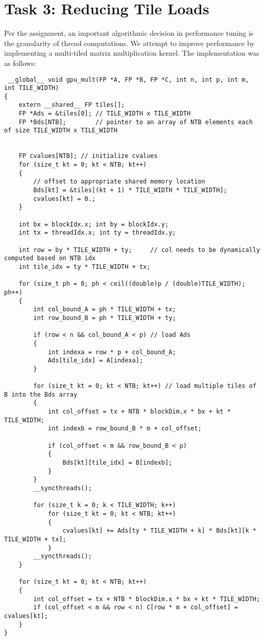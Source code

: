 \documentclass{article}
\begin{document}
\section{Task 3: Reducing Tile Loads}
Per the assignment, an important algorithmic decision in performance tuning 
is the granularity of thread computations. We attempt to improve performance 
by implementing a multi-tiled matrix multiplication kernel. The implementation was 
as follows:
\begin{lstlisting}
 __global__ void gpu_mult(FP *A, FP *B, FP *C, int n, int p, int m, int TILE_WIDTH)
{
    extern __shared__ FP tiles[];
    FP *Ads = &tiles[0]; // TILE_WIDTH x TILE_WIDTH
    FP *Bds[NTB];        // pointer to an array of NTB elements each of size TILE_WIDTH x TILE_WIDTH

    
    FP cvalues[NTB]; // initialize cvalues
    for (size_t kt = 0; kt < NTB; kt++)
    {
        // offset to appropriate shared memory location
        Bds[kt] = &tiles[(kt + 1) * TILE_WIDTH * TILE_WIDTH]; 
        cvalues[kt] = 0.;
    }

    int bx = blockIdx.x; int by = blockIdx.y;
    int tx = threadIdx.x; int ty = threadIdx.y;

    int row = by * TILE_WIDTH + ty;     // col needs to be dynamically computed based on NTB idx
    int tile_idx = ty * TILE_WIDTH + tx;

    for (size_t ph = 0; ph < ceil((double)p / (double)TILE_WIDTH); ph++)
    {
        int col_bound_A = ph * TILE_WIDTH + tx;
        int row_bound_B = ph * TILE_WIDTH + ty;

        if (row < n && col_bound_A < p) // load Ads
        {
            int indexa = row * p + col_bound_A;
            Ads[tile_idx] = A[indexa];
        }

        for (size_t kt = 0; kt < NTB; kt++) // load multiple tiles of B into the Bds array
        {
            int col_offset = tx + NTB * blockDim.x * bx + kt * TILE_WIDTH;
            int indexb = row_bound_B * m + col_offset;

            if (col_offset < m && row_bound_B < p)
            {
                Bds[kt][tile_idx] = B[indexb];
            }
        }
        __syncthreads();

        for (size_t k = 0; k < TILE_WIDTH; k++)
            for (size_t kt = 0; kt < NTB; kt++)
            {
                cvalues[kt] += Ads[ty * TILE_WIDTH + k] * Bds[kt][k * TILE_WIDTH + tx];
            }
        __syncthreads();
    }

    for (size_t kt = 0; kt < NTB; kt++)
    {
        int col_offset = tx + NTB * blockDim.x * bx + kt * TILE_WIDTH;
        if (col_offset < m && row < n) C[row * m + col_offset] = cvalues[kt];
    }
}
\end{lstlisting}
\end{document}
